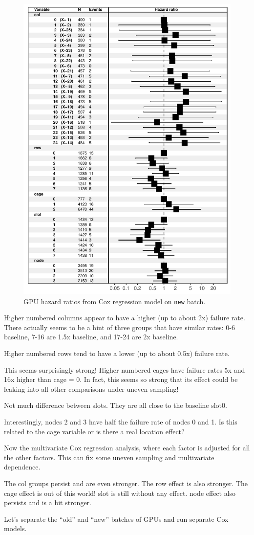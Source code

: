 \begin{figure}
  \includegraphics[width=5in]{figs/cox_n001.pdf}
  \caption{GPU hazard ratios from Cox regression model on {\tt new}
    batch.}
\end{figure}

Higher numbered columns appear to have a higher (up to about 2x)
failure rate. There actually seems to be a hint of three groups that
have similar rates: 0-6 baseline, 7-16 are 1.5x baseline, and 17-24
are 2x baseline. 

Higher numbered rows tend to have a lower (up to about 0.5x) failure rate.

This seems surprisingly strong! Higher numbered cages have failure
rates 5x and 16x higher than cage = 0. In fact, this seems so strong
that its effect could be leaking into all other comparisons under
uneven sampling!

Not much difference between slots. They are all close to the baseline
slot0.

Interestingly, nodes 2 and 3 have half the failure rate of nodes 0 and
1. Is this related to the cage variable or is there a real location
effect?

Now the multivariate Cox regression analysis, where each factor is
adjusted for all the other factors. This can fix some uneven sampling
and multivariate dependence. 

The col groups persist and are even stronger. The row effect is also
stronger. The cage effect is out of this world! slot is still without
any effect. node effect also persists and is a bit stronger. 

Let’s separate the “old” and “new” batches of GPUs and run separate
Cox models. 
